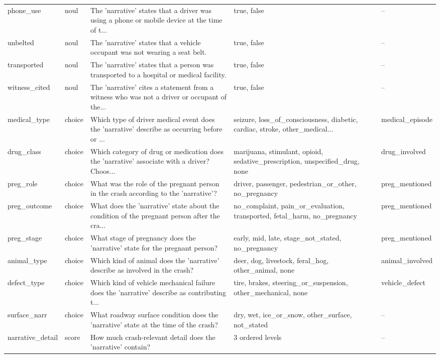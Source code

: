 \begin{table}[!htbp]
{\begin{minipage}{\jevtablewidth}
\begin{threeparttable}
\begin{tabular}{llp{}p{}l}
phone\_use & noul & The 'narrative' states that a driver was using a phone or mobile device at the time of t... & true, false & -- \\
unbelted & noul & The 'narrative' states that a vehicle occupant was not wearing a seat belt. & true, false & -- \\
transported & noul & The 'narrative' states that a person was transported to a hospital or medical facility. & true, false & -- \\
witness\_cited & noul & The 'narrative' cites a statement from a witness who was not a driver or occupant of the... & true, false & -- \\
medical\_type & choice & Which type of driver medical event does the 'narrative' describe as occurring before or ... & seizure, loss\_of\_consciousness, diabetic, cardiac, stroke, other\_medical... & medical\_episode \\
drug\_class & choice & Which category of drug or medication does the 'narrative' associate with a driver? Choos... & marijuana, stimulant, opioid, sedative\_prescription, unspecified\_drug, none & drug\_involved \\
preg\_role & choice & What was the role of the pregnant person in the crash according to the 'narrative'? & driver, passenger, pedestrian\_or\_other, no\_pregnancy & preg\_mentioned \\
preg\_outcome & choice & What does the 'narrative' state about the condition of the pregnant person after the cra... & no\_complaint, pain\_or\_evaluation, transported, fetal\_harm, no\_pregnancy & preg\_mentioned \\
preg\_stage & choice & What stage of pregnancy does the 'narrative' state for the pregnant person? & early, mid, late, stage\_not\_stated, no\_pregnancy & preg\_mentioned \\
animal\_type & choice & Which kind of animal does the 'narrative' describe as involved in the crash? & deer, dog, livestock, feral\_hog, other\_animal, none & animal\_involved \\
defect\_type & choice & Which kind of vehicle mechanical failure does the 'narrative' describe as contributing t... & tire, brakes, steering\_or\_suspension, other\_mechanical, none & vehicle\_defect \\
surface\_narr & choice & What roadway surface condition does the 'narrative' state at the time of the crash? & dry, wet, ice\_or\_snow, other\_surface, not\_stated & -- \\
narrative\_detail & score & How much crash-relevant detail does the 'narrative' contain? & 3 ordered levels & -- \\

\end{tabular}
\end{threeparttable}
\end{minipage}}
\end{table}
